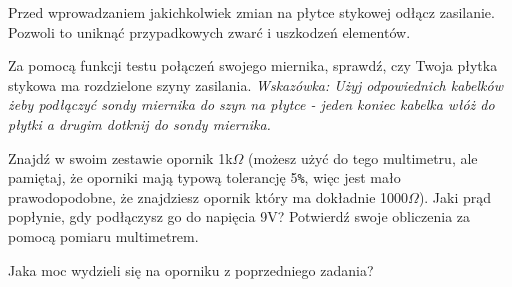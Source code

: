 \begin{ProTip}{}
  Przed wprowadzaniem jakichkolwiek zmian na płytce stykowej odłącz zasilanie. Pozwoli to uniknąć przypadkowych zwarć i uszkodzeń elementów.
\end{ProTip}

\begin{Zadanie}{}{}
  Za pomocą funkcji testu połączeń swojego miernika, sprawdź, czy Twoja płytka stykowa ma rozdzielone szyny zasilania.
  \textit{Wskazówka: Użyj odpowiednich kabelków żeby podłączyć sondy miernika do szyn na płytce - jeden koniec kabelka włóż do płytki a drugim
    dotknij do sondy miernika.}
\end{Zadanie}

\begin{Zadanie}{}{}
  Znajdź w swoim zestawie opornik 1k$\Omega$ (możesz użyć do tego multimetru, ale pamiętaj, że oporniki mają typową tolerancję 5\Verb$%$,
  więc jest mało prawodopodobne, że znajdziesz opornik który ma dokładnie 1000$\Omega$). Jaki prąd popłynie, gdy podłączysz go do napięcia 9V?
  Potwierdź swoje obliczenia za pomocą pomiaru multimetrem.
\end{Zadanie}

\begin{Zadanie}{}{}
  Jaka moc wydzieli się na oporniku z poprzedniego zadania?
\end{Zadanie}

